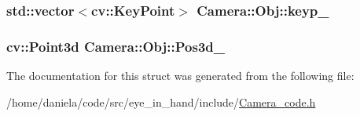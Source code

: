 \hypertarget{structCamera_1_1Obj_a359b9e57e394fac56872d31568c337f7}{
\subsubsection[{keyp\-\_\-}]{\setlength{\rightskip}{0pt plus 5cm}std\-::vector$<$cv\-::\-Key\-Point$>$ Camera\-::\-Obj\-::keyp\-\_\-}}\label{structCamera_1_1Obj_a359b9e57e394fac56872d31568c337f7}
\hypertarget{structCamera_1_1Obj_a46467af56d41483ff11fd897935904bc}{
\subsubsection[{Pos3d\-\_\-}]{\setlength{\rightskip}{0pt plus 5cm}cv\-::\-Point3d Camera\-::\-Obj\-::\-Pos3d\-\_\-}}\label{structCamera_1_1Obj_a46467af56d41483ff11fd897935904bc}


The documentation for this struct was generated from the following file\-:\begin{DoxyCompactItemize}
\item 
/home/daniela/code/src/eye\-\_\-in\-\_\-hand/include/\hyperlink{Camera__code_8h}{Camera\-\_\-code.\-h}\end{DoxyCompactItemize}
